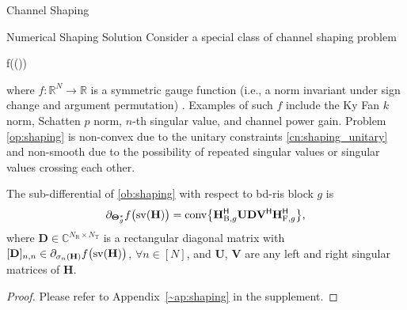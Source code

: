 \documentclass[journal]{IEEEtran}
\begin{document}
\begin{section}{Channel Shaping}
	\begin{subsection}{Numerical Shaping Solution}
		\label{sc:shaping_numerical}
		Consider a special class of channel shaping problem
		\begin{maxi!}
			{\scriptstyle{\mathbf{\Theta}}}{f\bigl(\sv()\bigr)}{\label{op:shaping}}{\label{ob:shaping}}
		\end{maxi!}
		where $f: \mathbb{R}^{N} \to \mathbb{R}$ is a symmetric gauge function (i.e., a norm invariant under sign change and argument permutation) \cite{Watson1992}.
		Examples of such $f$ include the Ky Fan $k$ norm, Schatten $p$ norm, $n$-th singular value, and channel power gain.
		Problem \eqref{op:shaping} is non-convex due to the unitary constraints \eqref{cn:shaping_unitary} and non-smooth due to the possibility of repeated singular values or singular values crossing each other.
		\begin{proposition}
			\label{pp:shaping}
			The sub-differential of \eqref{ob:shaping} with respect to \gls{bd}-\gls{ris} block $g$ is
			\begin{equation}
				\label{eq:shaping_subdiff}
				\partial_{\mathbf{\Theta}_g^*} f\bigl(\operatorname{sv}(\mathbf{H})\bigr) = \operatorname{conv} \bigl\{ \mathbf{H}_{\mathrm{B},g}^\mathsf{H} \mathbf{U} \mathbf{D} \mathbf{V}^\mathsf{H} \mathbf{H}_{\mathrm{F},g}^\mathsf{H} \bigr\},
			\end{equation}
			where $\mathbf{D} \in \mathbb{C}^{N_\mathrm{R} \times N_\mathrm{T}}$ is a rectangular diagonal matrix with $[\mathbf{D}]_{n,n} \in \partial_{\sigma_n(\mathbf{H})} f\bigl(\operatorname{sv}(\mathbf{H})\bigr)$, $\forall n \in [N]$, and $\mathbf{U}$, $\mathbf{V}$ are any left and right singular matrices of $\mathbf{H}$.
		\end{proposition}

		\begin{proof}
			Please refer to Appendix~\ref{~ap:shaping} in the supplement.
		\end{proof}


\end{subsection}
\end{section}
\end{document}
